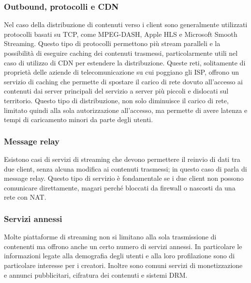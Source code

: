 		\subsubsection{Outbound, protocolli e \gls{CDN}}
			Nel caso della distribuzione di contenuti verso i client sono generalmente utilizzati protocolli basati su TCP, come MPEG-DASH, Apple HLS e Microsoft Smooth Streaming. Questo tipo di protocolli permettono più stream paralleli e la possibilità di eseguire caching dei contenuti trasmessi, particolarmente utili nel caso di utilizzo di \gls{CDN} per estendere la distribuzione. Queste reti, solitamente di proprietà delle aziende di telecomunicazione su cui poggiano gli ISP, offrono un servizio di caching che permette di spostare il carico di rete dovuto all'accesso ai contenuti dai server principali del servizio a server più piccoli e dislocati sul territorio. Questo tipo di distribuzione, non solo diminuisce il carico di rete, limitato quindi alla sola autorizzazione all'accesso, ma permette di avere latenza e tempi di caricamento minori da parte degli utenti.			

		\subsubsection{Message relay}
			Esistono casi di servizi di streaming che devono permettere il reinvio di dati tra due client, senza alcuna modifica ai contenuti trasmessi; in questo caso di parla di message relay. Questo tipo di servizio è fondamentale se i due client non possono comunicare direttamente, magari perché bloccati da firewall o nascosti da una rete con NAT.\@

		\subsubsection{Servizi annessi}
			Molte piattaforme di streaming non si limitano alla sola trasmissione di contenenti ma offrono anche un certo numero di servizi annessi. In particolare le informazioni legate alla demografia degli utenti e alla loro profilazione sono di particolare interesse per i creatori. Inoltre sono comuni servizi di monetizzazione e annunci pubblicitari, cifratura dei contenuti e sistemi DRM.\@


